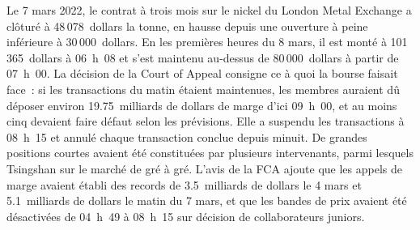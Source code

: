 Le 7 mars 2022, le contrat à trois mois sur le nickel du London Metal Exchange a clôturé à 48\,078~dollars la tonne, en hausse depuis une ouverture à peine inférieure à 30\,000~dollars. En
les premières heures du 8 mars, il est monté à 101\,365~dollars à 06~h~08 et s'est maintenu au-dessus de 80\,000~dollars à partir de 07~h~00. La décision de la Court of Appeal consigne ce à quoi la
bourse faisait face~: si les transactions du matin étaient maintenues, les membres auraient dû déposer environ 19.75~milliards de dollars de marge d'ici 09~h~00, et au moins cinq
devaient faire défaut selon les prévisions. Elle a suspendu les transactions à 08~h~15 et annulé chaque transaction conclue depuis minuit. De grandes positions courtes avaient été constituées par plusieurs
intervenants, parmi lesquels Tsingshan sur le marché de gré à gré. L'avis de la FCA ajoute que les appels de marge avaient établi des records de 3.5~milliards de dollars le 4
mars et 5.1~milliards de dollars le matin du 7 mars, et que les bandes de prix avaient été désactivées de 04~h~49 à 08~h~15 sur décision de collaborateurs juniors.

\begin{omfigure}
\par
{}\label{fig:fm:case-studies-ii:nickel}
\end{omfigure}

